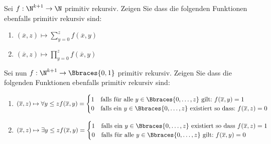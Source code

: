 
\begin{exercise}

Sei $f: \N^{k+1} \to \N$ primitiv rekursiv.
Zeigen Sie dass die folgenden Funktionen ebenfalls primitiv rekursiv sind:

\begin{enumerate}[label = (\alph*)]
    \item $(\overline x, z) \mapsto \sum_{y=0}^z f(\overline x, y)$
    \item $(\overline x, z) \mapsto \prod_{y=0}^z f(\overline x, y)$
\end{enumerate}

Sei nun $f: \N^{k+1} \to \Bbraces{0, 1}$ primitiv rekursiv.
Zeigen Sie dass die folgenden Funktionen ebenfalls primitiv rekursiv sind:

\begin{enumerate}[label = (\alph*), start = 3]
    \item $(\overline x, z) \mapsto \forall y \leq z f(\overline x, y) = \begin{cases} 1 & \text{falls für alle}~ y \in \Bbraces{0, \dots, z} ~\text{gilt:}~ f(\overline x, y) = 1 \\ 0 & \text{falls ein}~ y \in \Bbraces{0, \dots, z} ~\text{existiert so dass:}~ f(\overline x, z) = 0 \end{cases}$
    \item $(\overline x, z) \mapsto \exists y \leq z f(\overline x, y) = \begin{cases} 1 & \text{falls ein}~ y \in \Bbraces{0, \dots, z} ~\text{existiert so dass}~ f(\overline x, z) = 1 \\ 0 & \text{falls für alle}~ y \in \Bbraces{0, \dots, z} ~\text{gilt:}~ f(\overline x, y) = 0 \end{cases}$
\end{enumerate}

\end{exercise}


